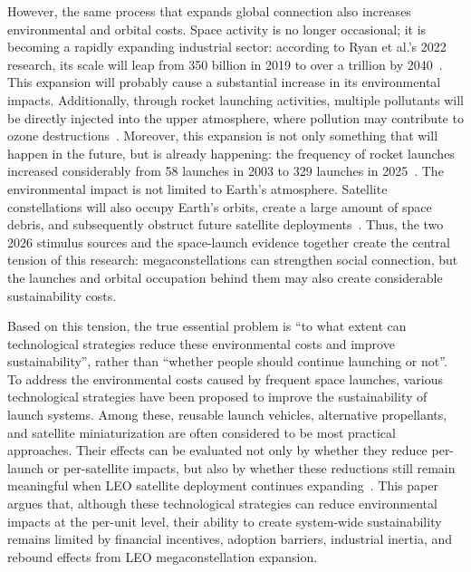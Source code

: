 \documentclass[12pt]{article}
\begin{document}
However, the same process that expands global connection also increases environmental and orbital costs. Space activity is no longer occasional; it is becoming a rapidly expanding industrial sector: according to Ryan et al.'s 2022 research, its scale will leap from 350 billion in 2019 to over a trillion by 2040~\citep{ryan2022ozone,bushnell2018newspace}. This expansion will probably cause a substantial increase in its environmental impacts. Additionally, through rocket launching activities, multiple pollutants will be directly injected into the upper atmosphere, where pollution may contribute to ozone destructions~\citep{ryan2022ozone,kokkinakis2022pollution}. Moreover, this expansion is not only something that will happen in the future, but is already happening: the frequency of rocket launches increased considerably from 58 launches in 2003 to 329 launches in 2025~\citep{mcdowell2025space}. The environmental impact is not limited to Earth's atmosphere. Satellite constellations will also occupy Earth's orbits, create a large amount of space debris, and subsequently obstruct future satellite deployments~\citep{torres2020reusable}. Thus, the two 2026 stimulus sources and the space-launch evidence together create the central tension of this research: megaconstellations can strengthen social connection, but the launches and orbital occupation behind them may also create considerable sustainability costs.



Based on this tension, the true essential problem is ``to what extent can technological strategies reduce these environmental costs and improve sustainability'', rather than ``whether people should continue launching or not''. To address the environmental costs caused by frequent space launches, various technological strategies have been proposed to improve the sustainability of launch systems. Among these, reusable launch vehicles, alternative propellants, and satellite miniaturization are often considered to be most practical approaches. Their effects can be evaluated not only by whether they reduce per-launch or per-satellite impacts, but also by whether these reductions still remain meaningful when LEO satellite deployment continues expanding~\citep{wilson2022lifecycle,osoro2025leo}. This paper argues that, although these technological strategies can reduce environmental impacts at the per-unit level, their ability to create system-wide sustainability remains limited by financial incentives, adoption barriers, industrial inertia, and rebound effects from LEO megaconstellation expansion.
\end{document}

